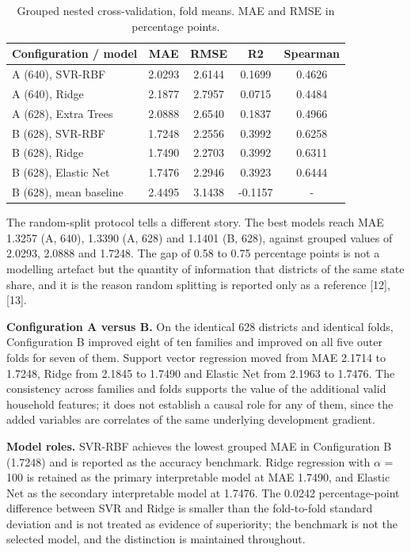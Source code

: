 \documentclass[conference]{IEEEtran}
\begin{document}
\begin{table}[t]
\centering
\caption{Grouped nested cross-validation, fold means. MAE and RMSE in percentage points.}
\label{tab:5998}
\small
\setlength{\tabcolsep}{4pt}
\begin{tabular}{lcccc}
\toprule
\textbf{Configuration / model} & \textbf{MAE} & \textbf{RMSE} & \textbf{R2} & \textbf{Spearman} \\
\midrule
A (640), SVR-RBF & 2.0293 & 2.6144 & 0.1699 & 0.4626 \\
A (640), Ridge & 2.1877 & 2.7957 & 0.0715 & 0.4484 \\
A (628), Extra Trees & 2.0888 & 2.6540 & 0.1837 & 0.4966 \\
B (628), SVR-RBF & 1.7248 & 2.2556 & 0.3992 & 0.6258 \\
B (628), Ridge & 1.7490 & 2.2703 & 0.3992 & 0.6311 \\
B (628), Elastic Net & 1.7476 & 2.2946 & 0.3923 & 0.6444 \\
B (628), mean baseline & 2.4495 & 3.1438 & -0.1157 & - \\
\bottomrule
\end{tabular}
\end{table}

The random-split protocol tells a different story. The best models reach MAE 1.3257 (A, 640), 1.3390 (A, 628) and 1.1401 (B, 628), against grouped values of 2.0293, 2.0888 and 1.7248. The gap of 0.58 to 0.75 percentage points is not a modelling artefact but the quantity of information that districts of the same state share, and it is the reason random splitting is reported only as a reference [12], [13].

\textbf{Configuration A versus B.} On the identical 628 districts and identical folds, Configuration B improved eight of ten families and improved on all five outer folds for seven of them. Support vector regression moved from MAE 2.1714 to 1.7248, Ridge from 2.1845 to 1.7490 and Elastic Net from 2.1963 to 1.7476. The consistency across families and folds supports the value of the additional valid household features; it does not establish a causal role for any of them, since the added variables are correlates of the same underlying development gradient.

\textbf{Model roles.} SVR-RBF achieves the lowest grouped MAE in Configuration B (1.7248) and is reported as the accuracy benchmark. Ridge regression with $\alpha$ = 100 is retained as the primary interpretable model at MAE 1.7490, and Elastic Net as the secondary interpretable model at 1.7476. The 0.0242 percentage-point difference between SVR and Ridge is smaller than the fold-to-fold standard deviation and is not treated as evidence of superiority; the benchmark is not the selected model, and the distinction is maintained throughout.
\end{document}
